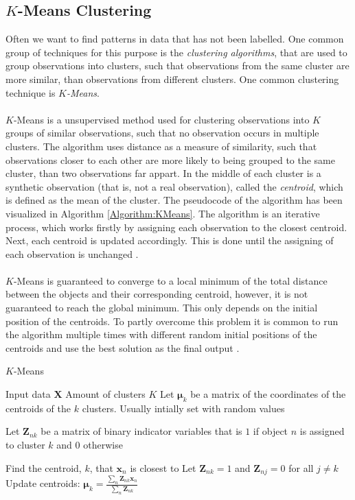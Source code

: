 \documentclass[./main.tex]{subfiles}
\begin{document}
\subsection{$K$-Means Clustering}

Often we want to find patterns in data that has not been labelled. One common group of techniques for this purpose is the \textit{clustering algorithms}, that are used to group observations into clusters, such that observations from the same cluster are more similar, than observations from different clusters. One common clustering technique is $K$\textit{-Means}.
\\
\\
$K$-Means is a unsupervised method used for clustering observations into $K$ groups of similar observations, such that no observation occurs in multiple clusters. The algorithm uses distance as a measure of similarity, such that observations closer to each other are more likely to being grouped to the same cluster, than two observations far appart. In the middle of each cluster is a synthetic observation (that is, not a real observation), called the \textit{centroid}, which is defined as the mean of the cluster. The pseudocode of the algorithm has been visualized in Algorithm \ref{Algorithm:KMeans}. The algorithm is an iterative process, which works firstly by assigning each observation to the closest centroid. Next, each centroid is updated accordingly. This is done until the assigning of each observation is unchanged \cite{MAD_book}.
\\
\\
$K$-Means is guaranteed to converge to a local minimum of the total distance between the objects and their corresponding centroid, however, it is not guaranteed to reach the global minimum. This only depends on the initial position of the centroids. To partly overcome this problem it is common to run the algorithm multiple times with different random initial positions of the centroids and use the best solution as the final output \cite{MAD_book}.

\begin{algorithm}[htbp]
    \caption{$K$-Means \cite{MAD_book}}
    \begin{algorithmic}[1]
        \Require Input data $\bm{X}$
        \Require Amount of clusters $K$
        \State Let $\bm{\mu}_k$ be a matrix of the coordinates of the centroids of the $k$ clusters. Usually intially set with random values
        \State \begin{varwidth}[t]{\linewidth}
            Let $\bm{Z}_{nk}$ be a matrix of binary indicator variables that is $1$ if object $n$ is assigned to cluster $k$ and $0$ otherwise
        \end{varwidth}
                \State Find the centroid, $k$, that $\bm{x}_n$ is closest to
                \State Let $\bm{Z}_{nk} = 1$ and $\bm{Z}_{nj} = 0$ for all $j \neq k$
            \EndFor
            \State Update centroids: $\bm{\mu}_k = \frac{\sum_n\bm{Z}_{nk} \bm{x}_n}{\sum_n \bm{Z}_{nk}}$
        \EndWhile
    \end{algorithmic}
    \label{Algorithm:KMeans}
\end{algorithm}
\end{document}
